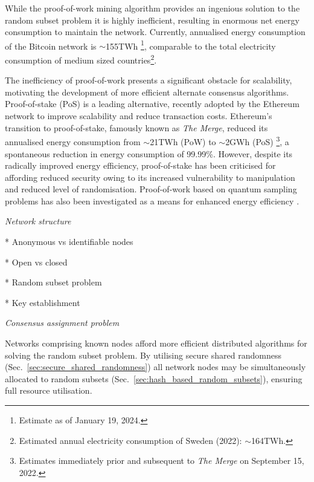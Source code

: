 While the proof-of-work mining algorithm provides an ingenious solution to the random subset problem it is highly inefficient, resulting in enormous net energy consumption to maintain the network. Currently, annualised energy consumption of the Bitcoin network is $\sim$155TWh \cite{CBECI}\footnote{Estimate as of January 19, 2024.}, comparable to the total electricity consumption of medium sized countries\footnote{Estimated annual electricity consumption of Sweden (2022): $\sim$164TWh.}.

The inefficiency of proof-of-work presents a significant obstacle for scalability, motivating the development of more efficient alternate consensus algorithms. Proof-of-stake (PoS) \cite{KingNadal, Bentov} is a leading alternative, recently adopted by the Ethereum network to improve scalability and reduce transaction costs. Ethereum's transition to proof-of-stake, famously known as \emph{The Merge}, reduced its annualised energy consumption from $\sim$21TWh (PoW) to $\sim$2GWh (PoS) \cite{CBECI}\footnote{Estimates immediately prior and subsequent to \emph{The Merge} on September 15, 2022.}, a spontaneous reduction in energy consumption of 99.99\%. However, despite its radically improved energy efficiency, proof-of-stake has been criticised for affording reduced security owing to its increased vulnerability to manipulation and reduced level of randomisation. Proof-of-work based on quantum sampling problems has also been investigated as a means for enhanced energy efficiency \cite{QPoW}.


\begin{center}\emph{Network structure}\end{center}

* Anonymous vs identifiable nodes

* Open vs closed

* Random subset problem

* Key establishment

\begin{center}\emph{Consensus assignment problem}\end{center}

Networks comprising known nodes afford more efficient distributed algorithms for solving the random subset problem. By utilising secure shared randomness (Sec.~\ref{sec:secure_shared_randomness}) all network nodes may be simultaneously allocated to random subsets (Sec.~\ref{sec:hash_based_random_subsets}), ensuring full resource utilisation.

